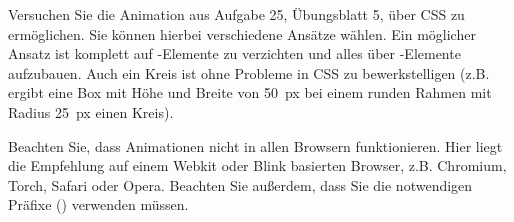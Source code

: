 %
\par Versuchen Sie die Animation aus Aufgabe 25, Übungsblatt 5, über CSS zu
ermöglichen. Sie können hierbei verschiedene Ansätze wählen. Ein möglicher
Ansatz ist komplett auf -Elemente zu verzichten und alles über
-Elemente aufzubauen. Auch ein Kreis ist ohne Probleme in CSS zu
bewerkstelligen (z.B. ergibt eine Box mit Höhe und Breite von \qty{50}{px} bei
einem runden Rahmen mit Radius \qty{25}{px} einen Kreis).
%
\par Beachten Sie, dass Animationen nicht in allen Browsern funktionieren. Hier
liegt die Empfehlung auf einem Webkit oder Blink basierten Browser, z.B.
Chromium, Torch, Safari oder Opera. Beachten Sie außerdem, dass Sie die
notwendigen Präfixe () verwenden müssen.